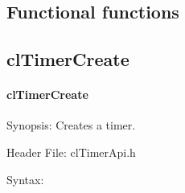\begin{flushleft}
\newpage

\section{Functional functions}
\subsection{clTimerCreate}
\hypertarget{pagetmr104}{}\paragraph{cl\-Timer\-Create}\label{pagetmr104}
\begin{Desc}
\item[Synopsis:]Creates a timer.\end{Desc}
\begin{Desc}
\item[Header File:]clTimerApi.h\end{Desc}
\begin{Desc}
\item[Syntax:]


\end{Desc}
\end{flushleft}
